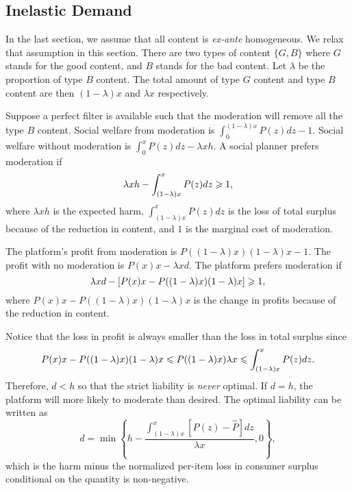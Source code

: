






\subsection{Inelastic Demand}
In the last section, we assume that all content is \emph{ex-ante} homogeneous. We relax that assumption in this section.
There are two types of content $\{G, B\}$ where $G$ stands for the good content, and $B$ stands for the bad content. Let $\lambda$ be the proportion of type $B$ content. The total amount of type $G$ content and type $B$ content are then $(1-\lambda)x$ and $\lambda x$ respectively. 

Suppose a perfect filter is available such that the moderation will remove all the type $B$ content. Social welfare from moderation is $\int_0^{(1-\lambda)x} P(z)dz-1$. Social welfare without moderation is $\int_0^x P(z)dz-\lambda xh$. A social planner prefers moderation if 
\begin{equation}\label{eqn:efficiency_2}
    \lambda xh - \int_{(1-\lambda)x}^x P(z)dz \geqslant 1,
\end{equation}
where $\lambda xh$ is the expected harm, $\int_{(1-\lambda)x}^x P(z)dz$ is the loss of total surplus because of the reduction in content, and $1$ is the marginal cost of moderation.

The platform's profit from moderation is $P((1-\lambda)x)(1-\lambda)x-1$. The profit with no moderation is $P(x)x-\lambda xd$. The platform prefers moderation if 
\begin{equation}\label{eqn:platform_2}
    \lambda xd - [P(x)x-P((1-\lambda)x)(1-\lambda)x] \geqslant 1,
\end{equation}
where $P(x)x-P((1-\lambda)x)(1-\lambda)x$ is the change in profits because of the reduction in content. 

Notice that the loss in profit is always smaller than the loss in total surplus since 
\begin{equation*}
    P(x)x-P((1-\lambda)x)(1-\lambda)x \leqslant P((1-\lambda)x)\lambda x \leqslant \int_{(1-\lambda)x}^x P(z)dz.
\end{equation*}
Therefore, $d<h$ so that the strict liability is \emph{never} optimal. If $d=h$, the platform will more likely to moderate than desired. 
The optimal liability can be written as 
\begin{equation}\label{eqn:liability_1}
    d=\min \left\{h-\frac{\int_{(1-\lambda)x}^x [P(z)-\hat{P}]dz}{\lambda x}, 0\right\},
\end{equation}
which is the harm minus the normalized per-item loss in consumer surplus conditional on the quantity is non-negative. 

